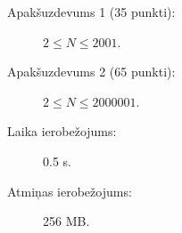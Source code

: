\documentclass{boi2014-lv}
\begin{document}
    \Scoring

    \begin{description}
        \item[Apakšuzdevums 1 (35 punkti):] $2 \le N \le 2001$.
        \item[Apakšuzdevums 2 (65 punkti):] $2 \le N \le 2000001$.
    \end{description}

    \Constraints

    \begin{description}
        \item[Laika ierobežojums:] 0.5 s.
        \item[Atmiņas ierobežojums:] 256 MB.
    \end{description}
\end{document}
